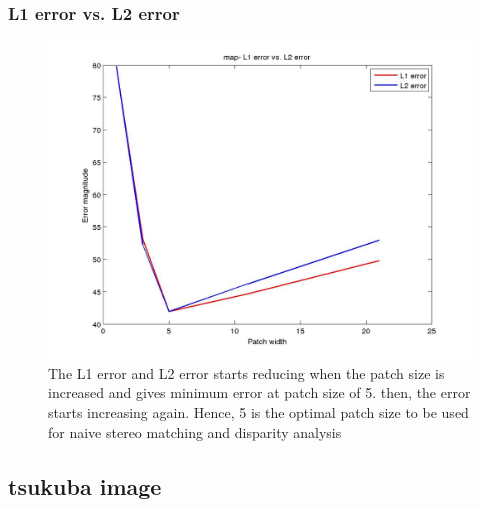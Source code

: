\documentclass[fleqn]{article}
\begin{document}
\clearpage
\subsubsection{L1 error vs. L2 error}
\begin{figure}[!ht]
\includegraphics[scale=0.3]{./pics/map_error_vs_patchsize.jpg}
\caption{The L1 error and L2 error starts reducing when the patch size is increased and gives minimum error at patch size of 5. 
then, the error starts increasing again. Hence, 5 is the optimal patch size to be used for naive stereo matching and disparity analysis}
\end{figure}

\clearpage
\subsection{tsukuba image}
\end{document}
